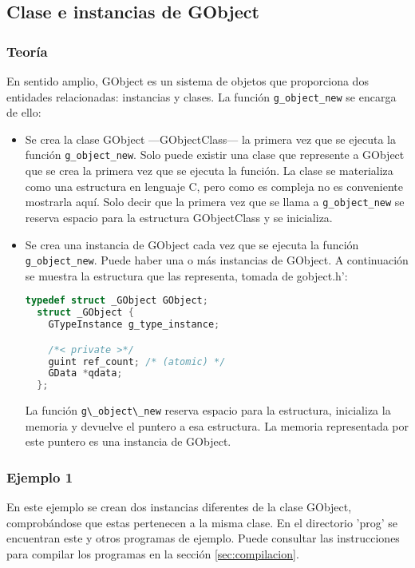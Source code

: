 \subsection{Clase e instancias de \textsf{GObject}} \label{subsec:clase_instancias_gobject}

\subsubsection{Teoría}
En sentido amplio, \textsf{GObject} es un sistema de objetos que proporciona dos entidades relacionadas: instancias y clases. La función \texttt{g\_object\_new} se
encarga de ello:
\begin{itemize}
  \tightlist
\item Se crea la clase \textsf{GObject} ---\textsf{GObjectClass}--- la primera vez que
  se ejecuta la función \texttt{g\_object\_new}. Solo puede existir una clase que
  represente a \textsf{GObject} que se crea la primera vez que se ejecuta la función.
  La clase se materializa como una estructura en lenguaje C, pero como es compleja no es
  conveniente mostrarla aquí. Solo decir que la primera vez que se llama a \texttt{g\_object\_new} se reserva espacio para la estructura \textsf{GObjectClass} y se
  inicializa.
\item Se crea una instancia de \textsf{GObject} cada vez que se ejecuta la función
  \texttt{g\_object\_new}. Puede haber una o más instancias de \textsf{GObject}.
  A continuación se muestra la estructura que las representa, tomada de \textsf{gobject.h}':
\begin{lstlisting}[language=C]
  typedef struct _GObject GObject;
  struct _GObject {
    GTypeInstance g_type_instance;

    /*< private >*/
    guint ref_count; /* (atomic) */
    GData *qdata;
  };
\end{lstlisting}
La función \passthrough{\lstinline!g\_object\_new!} reserva espacio para la estructura,
inicializa la memoria y devuelve el puntero a esa estructura. La memoria representada por este puntero es una instancia de \textsf{GObject}.
\end{itemize}

\subsubsection{Ejemplo 1}
En este ejemplo se crean dos instancias diferentes de la clase \textsf{GObject}, comprobándose que estas pertenecen a la misma clase. En el directorio '\textsf{prog}' se
encuentran este y otros programas de ejemplo. Puede consultar las instrucciones para
compilar los programas en la sección \ref{sec:compilacion}.

